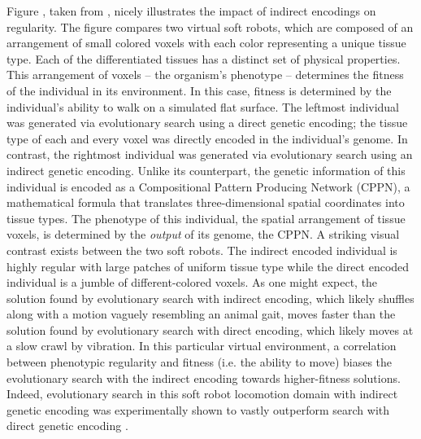 Figure , taken from \cite{Cheney2013UnshacklingEncoding}, nicely illustrates the impact of indirect encodings on regularity. The figure compares two virtual soft robots, which are composed of an arrangement of small colored voxels with each color representing a unique tissue type. Each of the differentiated tissues has a distinct set of physical properties. This arrangement of voxels -- the organism's phenotype -- determines the fitness of the individual in its environment. In this case, fitness is determined by the individual's ability to walk on a simulated flat surface. The leftmost individual was generated via evolutionary search using a direct genetic encoding; the tissue type of each and every voxel was directly encoded in the individual's genome. In contrast, the rightmost individual was generated via evolutionary search using an indirect genetic encoding. Unlike its counterpart, the genetic information of this individual is encoded as a Compositional Pattern Producing Network (CPPN), a mathematical formula that translates three-dimensional spatial coordinates into tissue types. The phenotype of this individual, the spatial arrangement of tissue voxels, is determined by the \textit{output} of its genome, the CPPN. A striking visual contrast exists between the two soft robots. The indirect encoded individual is highly regular with large patches of uniform tissue type while the direct encoded individual is a jumble of different-colored voxels. As one might expect, the solution found by evolutionary search with indirect encoding, which likely shuffles along with a motion vaguely resembling an animal gait, moves faster than the solution found by evolutionary search with direct encoding, which likely moves at a slow crawl by vibration. In this particular virtual environment, a correlation between phenotypic regularity and fitness (i.e. the ability to move) biases the evolutionary search with the indirect encoding towards higher-fitness solutions. Indeed, evolutionary search in this soft robot locomotion domain with indirect genetic encoding was experimentally shown to vastly outperform search with direct genetic encoding \cite{Cheney2013UnshacklingEncoding}.